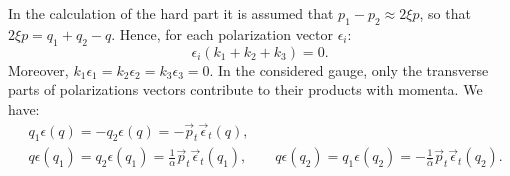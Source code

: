\documentclass[aps,prd,superscriptaddress,floatfix,showpacs]{revtex4}
\begin{document}
In the calculation of the hard part it is assumed that $p_1-p_2 \approx 2\xi p$, so that $2\xi p = q_1 + q_2 - q$. Hence, for each polarization vector $\epsilon_i$:
\begin{equation}
\epsilon_i (k_1 + k_2 + k_3 ) = 0.
\end{equation}
Moreover, $k_1 \epsilon_1 = k_2 \epsilon_2= k_3 \epsilon_3 =0$. %
In the considered gauge, only the transverse parts of polarizations vectors contribute to their products with momenta. We have:
\begin{equation}
\begin{aligned}
&q_1 \epsilon(q) = -q_2\epsilon(q) = -\vec{p}_t \vec{\epsilon}_t(q),
\\
&q \epsilon(q_1) = q_2 \epsilon(q_1) = \frac{1}{\alpha} \vec{p}_t \vec{\epsilon}_t(q_1), \qquad q \epsilon(q_2) = q_1 \epsilon(q_2) =  -\frac{1}{\bar{\alpha}} \vec{p}_t \vec{\epsilon}_t(q_2).
\end{aligned}
\end{equation}


%
%
\end{document}
